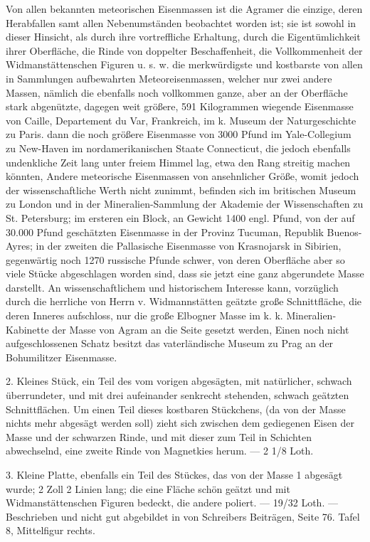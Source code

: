 \documentclass[a4paper, 11pt, oneside, polutonikogreek, german]{article}
\begin{document}
Von allen bekannten meteorischen Eisenmassen ist die Agramer die einzige, deren Herabfallen samt allen Nebenumständen beobachtet worden ist; sie ist sowohl in dieser Hinsicht, als durch ihre vortreffliche Erhaltung, durch die Eigentümlichkeit ihrer Oberfläche, die Rinde von doppelter Beschaffenheit, die Vollkommenheit der Widmanstättenschen Figuren u. s. w. die merkwürdigste und kostbarste von allen in Sammlungen aufbewahrten Meteoreisenmassen, welcher nur zwei andere Massen, nämlich die ebenfalls noch vollkommen ganze, aber an der Oberfläche stark abgenützte, dagegen weit größere, 591 Kilogrammen wiegende Eisenmasse von Caille, Departement du Var, Frankreich, im k. Museum der Naturgeschichte zu Paris. dann die noch größere Eisenmasse von 3000 Pfund im Yale-Collegium zu New-Haven im nordamerikanischen Staate Connecticut, die jedoch ebenfalls undenkliche Zeit lang unter freiem Himmel lag, etwa den Rang streitig machen könnten, Andere meteorische Eisenmassen von ansehnlicher Größe, womit jedoch der wissenschaftliche Werth nicht zunimmt, befinden sich im britischen Museum zu London und in der Mineralien-Sammlung der Akademie der Wissenschaften zu St. Petersburg; im ersteren ein Block, an Gewicht 1400 engl. Pfund, von der auf 30.000 Pfund geschätzten Eisenmasse in der Provinz Tucuman, Republik Buenos-Ayres; in der zweiten die Pallasische Eisenmasse von Krasnojarsk in Sibirien, gegenwärtig noch 1270 russische Pfunde schwer, von deren Oberfläche aber so viele Stücke abgeschlagen worden sind, dass sie jetzt eine ganz abgerundete Masse darstellt. An wissenschaftlichem und historischem Interesse kann, vorzüglich durch die herrliche von Herrn v. Widmannstätten geätzte große Schnittfläche, die deren Inneres aufschloss, nur die große Elbogner Masse im k. k. Mineralien-Kabinette der Masse von Agram an die Seite gesetzt werden, Einen noch nicht aufgeschlossenen Schatz besitzt das vaterländische Museum zu Prag an der Bohumilitzer Eisenmasse.

2. Kleines Stück, ein Teil des vom vorigen abgesägten, mit natürlicher, schwach überrundeter, und mit drei aufeinander senkrecht stehenden, schwach geätzten Schnittflächen. Um einen Teil dieses kostbaren Stückchens, (da von der Masse nichts mehr abgesägt werden soll) zieht sich zwischen dem gediegenen Eisen der Masse und der schwarzen Rinde, und mit dieser zum Teil in Schichten abwechselnd, eine zweite Rinde von Magnetkies herum. — 2 1/8 Loth.

3. Kleine Platte, ebenfalls ein Teil des Stückes, das von der Masse 1 abgesägt wurde; 2 Zoll 2 Linien lang; die eine Fläche schön geätzt und mit Widmanstättenschen Figuren bedeckt, die andere poliert. — 19/32 Loth. — Beschrieben und nicht gut abgebildet in von Schreibers Beiträgen, Seite 76. Tafel 8, Mittelfigur rechts.
\end{document}
